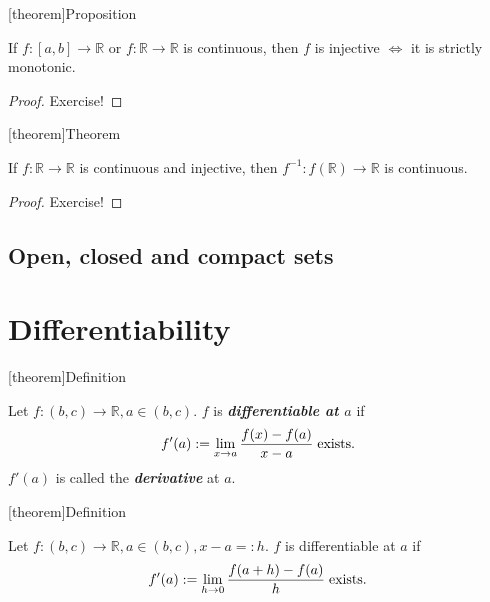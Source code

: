 \documentclass[12pt]{report}
\theoremstyle{definition}
\begin{document}
[theorem]{Proposition}
\begin{one-to-one continuous map}
    If $f:[a,b]\rightarrow\mathbb{R}$ or $f:\mathbb{R}\rightarrow\mathbb{R}$ is
    continuous, then $f$ is injective $\iff$
    it is strictly monotonic.
\end{one-to-one continuous map}

\begin{proof}
    Exercise!
\end{proof} 

[theorem]{Theorem}
\begin{continuous and injective f from R to R}
    If $f:\mathbb{R}\rightarrow\mathbb{R}$ is continuous and injective, then
    $f^{-1}:f(\mathbb{R})\rightarrow\mathbb{R}$ is continuous.
\end{continuous and injective f from R to R}

\begin{proof}
    Exercise!
\end{proof} 

\subsection{Open, closed and compact sets}


\section{Differentiability}

[theorem]{Definition}
\begin{differentiable}
    Let $f:(b,c) \rightarrow{} \mathbb{R}, a \in (b,c)$.
    $f$ is \textbf{\emph{differentiable at $a$}} if\[
        f'(a) := \lim_{x\rightarrow{}a} \frac{f(x) - f(a)}{x - a} \;\textnormal{exists.}\;
    \]$f'(a)$ is called the \textbf{\emph{derivative}} at $a$.
\end{differentiable}

[theorem]{Definition}
\begin{differentiable alternative def}
    Let $f:(b,c) \rightarrow{} \mathbb{R}, a \in (b,c), x - a =: h$.
    $f$ is differentiable at $a$ if\[
        f'(a) := \lim_{h\rightarrow{}0} \frac{f(a + h) - f(a)}{h} \;\textnormal{exists.}\;
    \]
\end{differentiable alternative def}
\end{document}
